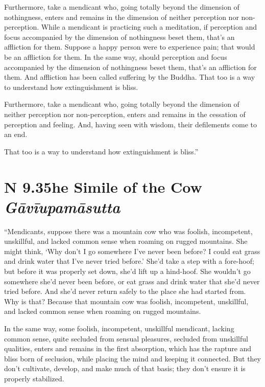 \documentclass[12pt,openany]{book}%
\newcommand*{\suttatitleacronym}[1]{\smaller[2]{#1}\vspace*{.3em}}
\newcommand*{\suttatitletranslation}[1]{\linebreak{#1}}
\newcommand*{\suttatitleroot}[1]{\linebreak\smaller[2]\itshape{#1}}
\newcommand*{\tocacronym}[1]{\hspace*{-3.3em}{#1}\quad}
\newcommand*{\toctranslation}[1]{#1}
\newcommand*{\tocroot}[1]{(\textit{#1})}
\begin{document}
Furthermore, take a mendicant who, going totally beyond the dimension of nothingness, enters and remains in the dimension of neither perception nor non-perception. While a mendicant is practicing such a meditation, if perception and focus accompanied by the dimension of nothingness beset them, that’s an affliction for them. Suppose a happy person were to experience pain; that would be an affliction for them. In the same way, should perception and focus accompanied by the dimension of nothingness beset them, that’s an affliction for them. And affliction has been called suffering by the Buddha. That too is a way to understand how extinguishment is bliss. 

Furthermore, take a mendicant who, going totally beyond the dimension of neither perception nor non-perception, enters and remains in the cessation of perception and feeling. And, having seen with wisdom, their defilements come to an end. 

That too is a way to understand how extinguishment is bliss.” 

%
\section*{{\suttatitleacronym AN 9.35}{\suttatitletranslation The Simile of the Cow }{\suttatitleroot Gāvīupamāsutta}}
\addcontentsline{toc}{section}{\tocacronym{AN 9.35} \toctranslation{The Simile of the Cow } \tocroot{Gāvīupamāsutta}}

“Mendicants, suppose there was a mountain cow who was foolish, incompetent, unskillful, and lacked common sense when roaming on rugged mountains. She might think, ‘Why don’t I go somewhere I’ve never been before? I could eat grass and drink water that I’ve never tried before.’ She’d take a step with a fore-hoof; but before it was properly set down, she’d lift up a hind-hoof. She wouldn’t go somewhere she’d never been before, or eat grass and drink water that she’d never tried before. And she’d never return safely to the place she had started from. Why is that? Because that mountain cow was foolish, incompetent, unskillful, and lacked common sense when roaming on rugged mountains. 

In the same way, some foolish, incompetent, unskillful mendicant, lacking common sense, quite secluded from sensual pleasures, secluded from unskillful qualities, enters and remains in the first absorption, which has the rapture and bliss born of seclusion, while placing the mind and keeping it connected. But they don’t cultivate, develop, and make much of that basis; they don’t ensure it is properly stabilized. 
\end{document}
